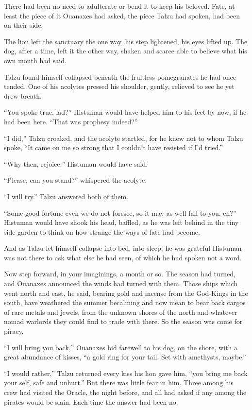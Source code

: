 There had been no need to adulterate or bend it to keep his beloved. Fate, at least the piece of it Ouanaxes had asked, the piece Talzu had spoken, had been on their side.

The lion left the sanctuary the one way, his step lightened, his eyes lifted up. The dog, after a time, left it the other way, shaken and scarce able to believe what his own mouth had said.

Talzu found himself collapsed beneath the fruitless pomegranates he had once tended. One of his acolytes pressed his shoulder, gently, relieved to see he yet drew breath.

``You spoke true, lad?'' Histuman would have helped him to his feet by now, if he had been here. ``That was prophesy indeed?''

``I did,'' Talzu croaked, and the acolyte startled, for he knew not to whom Talzu spoke, ``It came on me so strong that I couldn't have resisted if I'd tried.''

``Why then, rejoice,'' Histuman would have said.

``Please, can you stand?'' whispered the acolyte.

``I will try.'' Talzu answered both of them.

``Some good fortune even we do not foresee, so it may as well fall to you, eh?'' Histuman would have shook his head, baffled, as he was left behind in the tiny side garden to think on how strange the ways of fate had become.

And as Talzu let himself collapse into bed, into sleep, he was grateful Histuman was not there to ask what else he had seen, of which he had spoken not a word.

\secdiv

\noindent Now step forward, in your imaginings, a month or so. The season had turned, and Ouanaxes announced the winds had turned with them. Those ships which went north and east, he said, bearing gold and incense from the God-Kings in the south, have weathered the summer becalming and now mean to bear back cargos of rare metals and jewels, from the unknown shores of the north and whatever nomad warlords they could find to trade with there. So the season was come for piracy.

``I will bring you back,'' Ouanaxes bid farewell to his dog, on the shore, with a great abundance of kisses, ``a gold ring for your tail. Set with amethysts, maybe.''

``I would rather,'' Talzu returned every kiss his lion gave him, ``you bring me back your self, safe and unhurt.'' But there was little fear in him. Three among his crew had visited the Oracle, the night before, and all had asked if any among the pirates would be slain. Each time the answer had been no.

